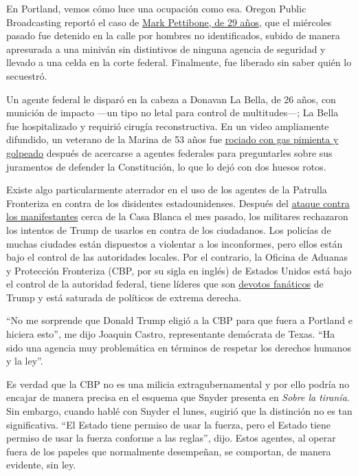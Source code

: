 En Portland, vemos cómo luce una ocupación como esa. Oregon Public
Broadcasting reportó el caso de
\href{https://www.opb.org/news/article/federal-law-enforcement-unmarked-vehicles-portland-protesters/}{Mark
Pettibone, de 29 años}, que el miércoles pasado fue detenido en la calle
por hombres no identificados, subido de manera apresurada a una miniván
sin distintivos de ninguna agencia de seguridad y llevado a una celda en
la corte federal. Finalmente, fue liberado sin saber quién lo secuestró.

Un agente federal le disparó en la cabeza a Donavan La Bella, de 26
años, con munición de impacto ---un tipo no letal para control de
multitudes---; La Bella fue hospitalizado y requirió cirugía
reconstructiva. En un video ampliamente difundido, un veterano de la
Marina de 53 años fue
\href{https://www.washingtonpost.com/nation/2020/07/20/christopher-david-portland-protest-video/}{rociado
con gas pimienta y golpeado} después de acercarse a agentes federales
para preguntarles sobre sus juramentos de defender la Constitución, lo
que lo dejó con dos huesos rotos.

Existe algo particularmente aterrador en el uso de los agentes de la
Patrulla Fronteriza en contra de los disidentes estadounidenses. Después
del
\href{https://www.nytimes.com/es/2020/06/03/espanol/mundo/trump-foto-iglesia-protestas.html}{ataque
contra los manifestantes} cerca de la Casa Blanca el mes pasado, los
militares rechazaron los intentos de Trump de usarlos en contra de los
ciudadanos. Los policías de muchas ciudades están dispuestos a violentar
a los inconformes, pero ellos están bajo el control de las autoridades
locales. Por el contrario, la Oficina de Aduanas y Protección Fronteriza
(CBP, por su sigla en inglés) de Estados Unidos está bajo el control de
la autoridad federal, tiene líderes que son
\href{https://www.newyorker.com/news/news-desk/the-border-patrol-was-primed-for-president-trump}{devotos
fanáticos} de Trump y está saturada de políticos de extrema derecha.

``No me sorprende que Donald Trump eligió a la CBP para que fuera a
Portland e hiciera esto'', me dijo Joaquin Castro, representante
demócrata de Texas. ``Ha sido una agencia muy problemática en términos
de respetar los derechos humanos y la ley''.

Es verdad que la CBP no es una milicia extragubernamental y por ello
podría no encajar de manera precisa en el esquema que Snyder presenta en
\emph{Sobre la tiranía}. Sin embargo, cuando hablé con Snyder el lunes,
sugirió que la distinción no es tan significativa. ``El Estado tiene
permiso de usar la fuerza, pero el Estado tiene permiso de usar la
fuerza conforme a las reglas'', dijo. Estos agentes, al operar fuera de
los papeles que normalmente desempeñan, se comportan, de manera
evidente, sin ley.

